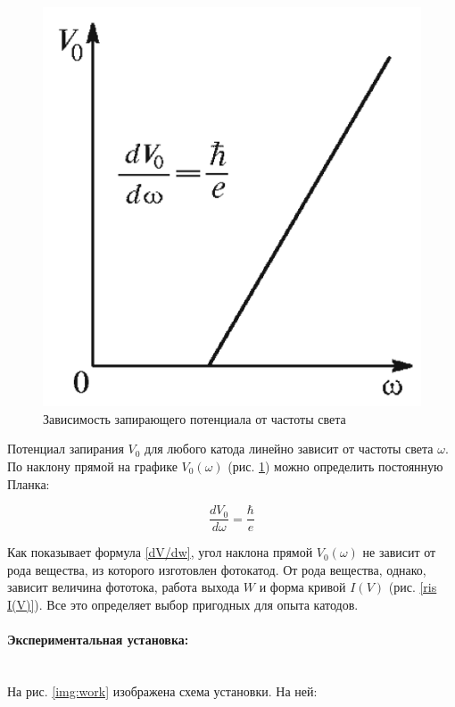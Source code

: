 \documentclass[a4paper, 12pt]{article}
\newcommand{\parag}[1]{\paragraph*{#1:}}
\begin{document}
\begin{figure}[H]
    \centering
\includegraphics[scale=0.3]{V(w)}
    \caption{Зависимость запирающего потенциала
        от частоты света}
    \label{ris V(w)}
\end{figure}

Потенциал запирания $ V_0 $ для любого катода линейно зависит от
частоты света $ \omega $. По наклону прямой на графике $ V_0(\omega) $ (рис. \ref{ris V(w)}) можно определить постоянную Планка:

\begin{equation}\label{dV/dw}
\dfrac{dV_0}{d\omega} = \dfrac{\hbar}{e}
\end{equation}

Как показывает формула \eqref{dV/dw}, угол наклона прямой $ V_0(\omega) $ не зависит от рода вещества, из которого изготовлен фотокатод. От рода вещества, однако, зависит величина фототока, работа выхода $ W $ и форма кривой $ I(V) $ (рис. \ref{ris I(V)}). Все это определяет выбор пригодных для
опыта катодов.

\parag {Экспериментальная установка}~\\

На рис. \ref{img:work} изображена схема установки. На ней:
\end{document}
